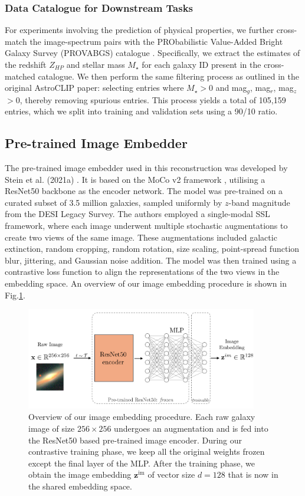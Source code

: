 \documentclass[a4paper,12pt]{article}
\begin{document}
\subsubsection{Data Catalogue for Downstream Tasks}

For experiments involving the prediction of physical properties, we further cross-match the image-spectrum pairs with the PRObabilistic Value-Added Bright Galaxy Survey (PROVABGS) catalogue \cite{PROVABGS}. Specifically, we extract the estimates of the redshift $Z_{HP}$ and stellar mass $M_{\star}$ for each galaxy ID present in the cross-matched catalogue. We then perform the same filtering process as outlined in the original AstroCLIP paper: selecting entries where $M_{\star} > 0$ and mag$_g$, mag$_r$, mag$_z$ $> 0$, thereby removing spurious entries. This process yields a total of 105,159 entries, which we split into training and validation sets using a 90/10 ratio.


\subsection{Pre-trained Image Embedder} 
\label{sec:resnet}
The pre-trained image embedder used in this reconstruction was developed by Stein et al. (2021a) \cite{stein}. It is based on the MoCo v2 framework \cite{mocov2}, utilising a ResNet50 backbone as the encoder network. The model was pre-trained on a curated subset of 3.5 million galaxies, sampled uniformly by $z$-band magnitude from the DESI Legacy Survey. The authors employed a single-modal SSL framework, where each image underwent multiple stochastic augmentations to create two views of the same image. These augmentations included galactic extinction, random cropping, random rotation, size scaling, point-spread function blur, jittering, and Gaussian noise addition. The model was then trained using a contrastive loss function to align the representations of the two views in the embedding space. An overview of our image embedding procedure is shown in Fig.\ref{fig:resnet}.

\begin{figure}[H]
    \centering
    \includegraphics[width=0.9\textwidth]{../figures/diagram_resnet.pdf}
    \caption{Overview of our image embedding procedure. Each raw galaxy image of size $256 \times 256$ undergoes an augmentation and is fed into the ResNet50 based pre-trained image encoder. During our contrastive training phase, we keep all the original weights frozen except the final layer of the MLP. After the training phase, we obtain the image embedding $\mathbf{z}^{\text{im}}$ of vector size $d=128$ that is now in the shared embedding space.}
    \label{fig:resnet}
\end{figure}
\end{document}

